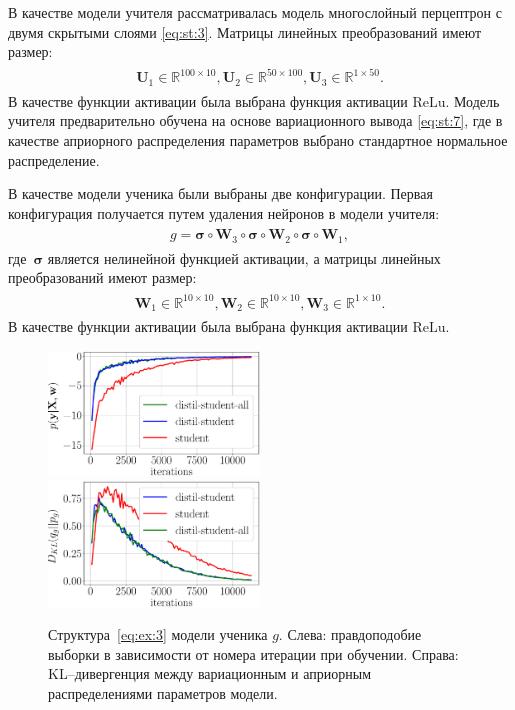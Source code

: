 \documentclass[12pt]{a&t}
\begin{document}
В качестве модели учителя рассматривалась модель многослойный перцептрон с двумя скрытыми слоями \eqref{eq:st:3}. Матрицы линейных преобразований имеют размер:
\begin{gather}
\label{eq:ex:2}
\begin{aligned}
\mathbf{U}_{1} \in \mathbb{R}^{100 \times 10}, \mathbf{U}_{2} \in \mathbb{R}^{50 \times 100},  \mathbf{U}_{3} \in \mathbb{R}^{1 \times 50}.
\end{aligned}
\end{gather}
В качестве функции активации была выбрана функция активации $\text{ReLu}$.
Модель учителя предварительно обучена на основе вариационного вывода \eqref{eq:st:7}, где в качестве априорного распределения параметров выбрано стандартное нормальное распределение.

В качестве модели ученика были выбраны две конфигурации. Первая конфигурация получается путем удаления нейронов в модели учителя:
\begin{gather}
\label{eq:ex:3}
\begin{aligned}
g = \bm{\sigma} \circ \mathbf{W}_3 \circ \bm{\sigma} \circ \mathbf{W}_2 \circ \bm{\sigma} \circ \mathbf{W}_1,
\end{aligned}
\end{gather}
где~$\bm{\sigma}$ является нелинейной функцией активации, а матрицы линейных преобразований имеют размер:
\begin{gather}
\label{eq:ex:4}
\begin{aligned}
\mathbf{W}_{1} \in \mathbb{R}^{10 \times 10}, \mathbf{W}_{2} \in \mathbb{R}^{10 \times 10},  \mathbf{W}_{3} \in \mathbb{R}^{1 \times 10}.
\end{aligned}
\end{gather}
В качестве функции активации была выбрана функция активации $\text{ReLu}$.

\begin{figure}[h!]
\includegraphics[width=0.5\textwidth]{synthetic_likelihood_3_layers.eps}
\includegraphics[width=0.5\textwidth]{synthetic_D_KL_3_layers.eps}
\caption{Структура~\eqref{eq:ex:3} модели ученика $g$. Слева: правдоподобие выборки в зависимости от номера итерации при обучении. Справа: KL--дивергенция между вариационным и априорным распределениями параметров модели.}
\label{exp:fig1}
\end{figure}
\end{document}

